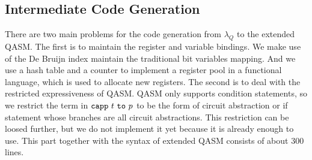 \subsection{Intermediate Code Generation}
There are two main problems for the code generation from $\lambda_Q$ to the extended QASM.
The first is to maintain the register and variable bindings.
We make use of the De Bruijn index maintain the traditional bit variables mapping.
And we use a hash table and a counter to implement a register pool in a functional language, which is used to allocate new registers.
The second is to deal with the restricted expressiveness of QASM.
QASM only supports condition statements, so we restrict the term in $\capp\ t\ \mathtt{to}\ p$ to be the form of circuit abstraction or if statement whose branches are all circuit abstractions.
This restriction can be loosed further, but we do not implement it yet because it is already enough to use.
This part together with the syntax of extended QASM consists of about 300 lines.